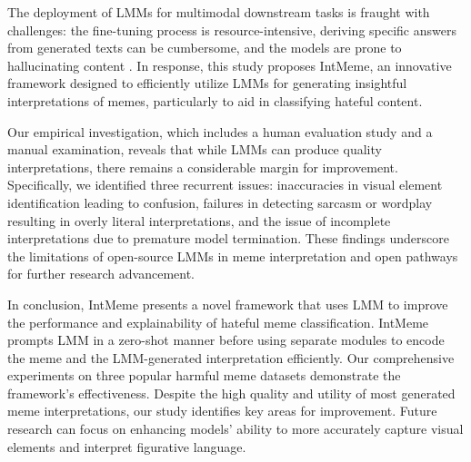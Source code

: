 

The deployment of LMMs for multimodal downstream tasks is fraught with challenges: the fine-tuning process is resource-intensive, deriving specific answers from generated texts can be cumbersome, and the models are prone to hallucinating content \cite{ji2023survey}. In response, this study proposes \textsf{IntMeme}, an innovative framework designed to efficiently utilize LMMs for generating insightful interpretations of memes, particularly to aid in classifying hateful content.

Our empirical investigation, which includes a human evaluation study and a manual examination, reveals that while LMMs can produce quality interpretations, there remains a considerable margin for improvement. Specifically, we identified three recurrent issues: inaccuracies in visual element identification leading to confusion, failures in detecting sarcasm or wordplay resulting in overly literal interpretations, and the issue of incomplete interpretations due to premature model termination. These findings underscore the limitations of open-source LMMs in meme interpretation and open pathways for further research advancement.

In conclusion, \textsf{IntMeme} presents a novel framework that uses LMM to improve the performance and explainability of hateful meme classification. \textsf{IntMeme} prompts LMM in a zero-shot manner before using separate modules to encode the meme and the LMM-generated interpretation efficiently. Our comprehensive experiments on three popular harmful meme datasets demonstrate the framework's effectiveness. Despite the high quality and utility of most generated meme interpretations, our study identifies key areas for improvement. Future research can focus on enhancing models' ability to more accurately capture visual elements and interpret figurative language. 